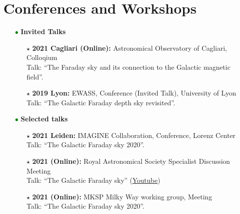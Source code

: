 \documentclass[11pt,a4paper,sans, table, dvipsnames]{moderncv}        %
\begin{document}

\vspace{\baselineskip}
\section{Conferences and Workshops}
\begin{itemize}
\item[\textcolor{Green}{$\bullet$}] {\textbf{Invited Talks}}
  \vspace{0.2\baselineskip}
\begin{itemize}
  \item[\textcolor{Black}{$\star$}]{\textbf{2021 Cagliari (Online):} Astronomical Observatory of Cagliari, Colloqium\\ Talk: ``The Faraday sky and its connection to the Galactic magnetic field''.}
  \item[\textcolor{Black}{$\star$}]{\textbf{2019 Lyon:} EWASS, Conference (Invited Talk), University of Lyon \\ Talk: ``The Galactic Faraday depth sky revisited''.}
\end{itemize}
  \vspace{0.4\baselineskip}
\item[\textcolor{Green}{$\bullet$}] {\textbf{Selected talks}}
  \vspace{0.2\baselineskip}
  \begin{itemize}
    \item[\textcolor{Black}{$\star$}]{\textbf{2021 Leiden:} IMAGINE Collaboration, Conference, Lorenz Center\\ Talk: ``The Galactic Faraday sky 2020''.}

    \item[\textcolor{Black}{$\star$}]{\textbf{2021 (Online):} Royal Astronomical Society Specialist Discussion Meeting\\ Talk: ``The Galactic Faraday sky'' (\href{https://www.youtube.com/watch?v=1HM33vWJbUM}{Youtube})}

    \item[\textcolor{Black}{$\star$}]{\textbf{2021 (Online):} MKSP Milky Way working group, Meeting\\ Talk: ``The Galactic Faraday sky 2020''.}


\end{itemize}
\end{itemize}
\end{document}
